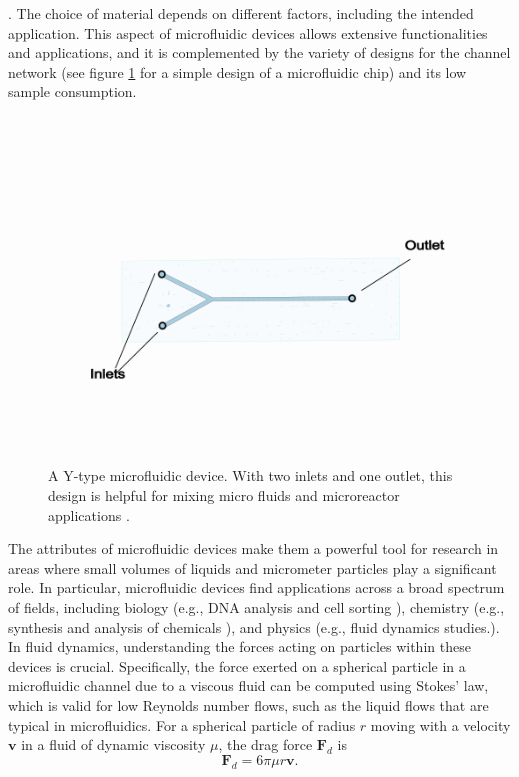 \documentclass[letterpaper,12pt,oneside]{book}
\begin{document}
 \cite{Liu2008}.
 The choice of material depends on different factors, including the intended application. This aspect of microfluidic devices allows extensive functionalities and applications, and it is complemented by the variety of designs for the channel network (see figure \ref{simple design} for a simple design of a microfluidic chip) and its low sample consumption.
 \begin{figure}[H]
     \centering
     \includegraphics[trim = {0 1.5cm 0 0.7cm}, scale=0.4]{Diatomsexperimentalmethods/Microfluidics designs/Screen Shot 2024-01-17 at 5.34.18 PM.png}
     \caption{A Y-type microfluidic device. With two inlets and one outlet, this design is helpful for mixing micro fluids and microreactor applications \cite{niculescu2022review}. }
     \label{simple design}
 \end{figure}
 
The attributes of microfluidic devices make them a powerful tool for research in areas where small volumes of liquids and micrometer particles play a significant role. In particular, microfluidic devices find applications across a broad spectrum of fields, including biology (e.g., DNA analysis and cell sorting \cite{wang2011enhancedmicroandopti,paegel2003microfluidicDNA}), chemistry (e.g., synthesis and analysis of chemicals \cite{niculescu2022review}), and physics (e.g., fluid dynamics studies.).\\ In fluid dynamics, understanding the forces acting on particles within these devices is crucial. Specifically, the force exerted on a spherical particle in a microfluidic channel due to a viscous fluid can be computed using Stokes' law, which is valid for low Reynolds number flows, such as the liquid flows that are typical in microfluidics. For a spherical particle of radius \( r \) moving with a velocity \( \mathbf{v} \) in a fluid of dynamic viscosity \( \mu \), the drag force \( \mathbf{F}_d \) is
\begin{equation}
    \mathbf{F}_d = 6 \pi \mu r \mathbf{v}.
\end{equation}
\end{document}
